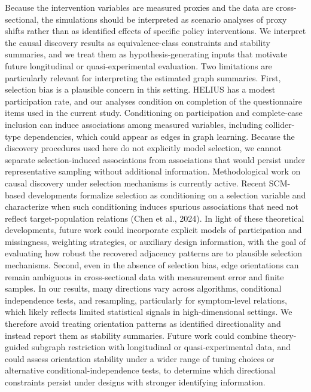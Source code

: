 \documentclass[
]{article}
\begin{document}
\textcolor{BrickRed}{Because the intervention variables are measured proxies and the data are cross-sectional, the simulations should be interpreted as scenario analyses of proxy shifts rather than as identified effects of specific policy interventions.}
\textcolor{BrickRed}{We interpret the causal discovery results as equivalence-class constraints and stability summaries, and we treat them as hypothesis-generating inputs that motivate future longitudinal or quasi-experimental evaluation.}
\textcolor{BrickRed}{Two limitations are particularly relevant for interpreting the estimated graph summaries. First, selection bias is a plausible concern in this setting. HELIUS has a modest participation rate, and our analyses condition on completion of the questionnaire items used in the current study. Conditioning on participation and complete-case inclusion can induce associations among measured variables, including collider-type dependencies, which could appear as edges in graph learning. Because the discovery procedures used here do not explicitly model selection, we cannot separate selection-induced associations from associations that would persist under representative sampling without additional information. Methodological work on causal discovery under selection mechanisms is currently active. Recent SCM-based developments formalize selection as conditioning on a selection variable and characterize when such conditioning induces spurious associations that need not reflect target-population relations}
(Chen et al., 2024).
\textcolor{BrickRed}{In light of these theoretical developments, future work could incorporate explicit models of participation and missingness, weighting strategies, or auxiliary design information, with the goal of evaluating how robust the recovered adjacency patterns are to plausible selection mechanisms.}
\textcolor{BrickRed}{Second, even in the absence of selection bias, edge orientations can remain ambiguous in cross-sectional data with measurement error and finite samples. In our results, many directions vary across algorithms, conditional independence tests, and resampling, particularly for symptom-level relations, which likely reflects limited statistical signals in high-dimensional settings. We therefore avoid treating orientation patterns as identified directionality and instead report them as stability summaries. 
Future work could combine theory-guided subgraph restriction with longitudinal or quasi-experimental data, and could assess orientation stability under a wider range of tuning choices or alternative conditional-independence tests, to determine which directional constraints persist under designs with stronger identifying information.}
\end{document}
